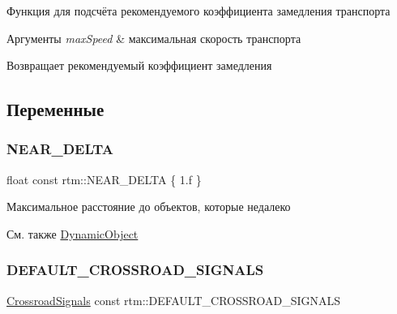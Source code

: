 Функция для подсчёта рекомендуемого коэффициента замедления транспорта 


\begin{DoxyParams}{Аргументы}
{\em max\+Speed} & максимальная скорость транспорта \\
\hline
\end{DoxyParams}
\begin{DoxyReturn}{Возвращает}
рекомендуемый коэффициент замедления 
\end{DoxyReturn}


\subsection{Переменные}
\mbox{\label{namespacertm_ac6b72ea86e31b2b9ba35f29964ce0f5d}} 
\subsubsection{\texorpdfstring{N\+E\+A\+R\+\_\+\+D\+E\+L\+TA}{NEAR\_DELTA}}
{\footnotesize\ttfamily float const rtm\+::\+N\+E\+A\+R\+\_\+\+D\+E\+L\+TA \{ 1.f \}}



Максимальное расстояние до объектов, которые недалеко 

\begin{DoxySeeAlso}{См. также}
\hyperlink{classrtm_1_1_dynamic_object}{Dynamic\+Object} 
\end{DoxySeeAlso}
\mbox{\label{namespacertm_ac3892e23135322d9026ef00af1a76344}} 
\subsubsection{\texorpdfstring{D\+E\+F\+A\+U\+L\+T\+\_\+\+C\+R\+O\+S\+S\+R\+O\+A\+D\+\_\+\+S\+I\+G\+N\+A\+LS}{DEFAULT\_CROSSROAD\_SIGNALS}}
{\footnotesize\ttfamily \hyperlink{namespacertm_afa6df86cef8e2ebcc053ad994e440354}{Crossroad\+Signals} const rtm\+::\+D\+E\+F\+A\+U\+L\+T\+\_\+\+C\+R\+O\+S\+S\+R\+O\+A\+D\+\_\+\+S\+I\+G\+N\+A\+LS}

